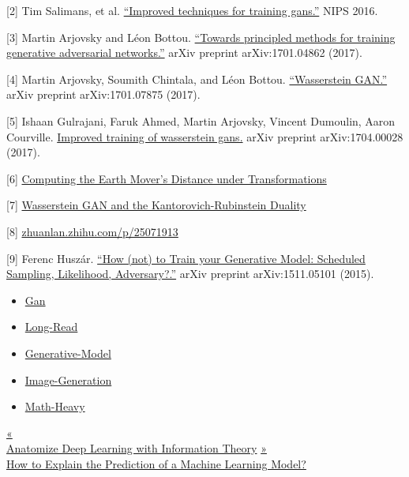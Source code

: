 {[}2{]} Tim Salimans, et al. \href{http://papers.nips.cc/paper/6125-improved-techniques-for-training-gans.pdf}{``Improved techniques for training gans.''} NIPS 2016.

{[}3{]} Martin Arjovsky and Léon Bottou. \href{https://arxiv.org/pdf/1701.04862.pdf}{``Towards principled methods for training generative adversarial networks.''} arXiv preprint arXiv:1701.04862 (2017).

{[}4{]} Martin Arjovsky, Soumith Chintala, and Léon Bottou. \href{https://arxiv.org/pdf/1701.07875.pdf}{``Wasserstein GAN.''} arXiv preprint arXiv:1701.07875 (2017).

{[}5{]} Ishaan Gulrajani, Faruk Ahmed, Martin Arjovsky, Vincent Dumoulin, Aaron Courville. \href{https://arxiv.org/pdf/1704.00028.pdf}{Improved training of wasserstein gans.} arXiv preprint arXiv:1704.00028 (2017).

{[}6{]} \href{http://robotics.stanford.edu/~scohen/research/emdg/emdg.html}{Computing the Earth Mover's Distance under Transformations}

{[}7{]} \href{https://vincentherrmann.github.io/blog/wasserstein/}{Wasserstein GAN and the Kantorovich-Rubinstein Duality}

{[}8{]} \href{https://zhuanlan.zhihu.com/p/25071913}{zhuanlan.zhihu.com/p/25071913}

{[}9{]} Ferenc Huszár. \href{https://arxiv.org/pdf/1511.05101.pdf}{``How (not) to Train your Generative Model: Scheduled Sampling, Likelihood, Adversary?.''} arXiv preprint arXiv:1511.05101 (2015).

\begin{itemize}
\tightlist
\item
  \href{https://lilianweng.github.io/tags/gan/}{Gan}
\item
  \href{https://lilianweng.github.io/tags/long-read/}{Long-Read}
\item
  \href{https://lilianweng.github.io/tags/generative-model/}{Generative-Model}
\item
  \href{https://lilianweng.github.io/tags/image-generation/}{Image-Generation}
\item
  \href{https://lilianweng.github.io/tags/math-heavy/}{Math-Heavy}
\end{itemize}

\href{https://lilianweng.github.io/posts/2017-09-28-information-bottleneck/}{{« }\\
{Anatomize Deep Learning with Information Theory}} \href{https://lilianweng.github.io/posts/2017-08-01-interpretation/}{{ »}\\
{How to Explain the Prediction of a Machine Learning Model?}}

